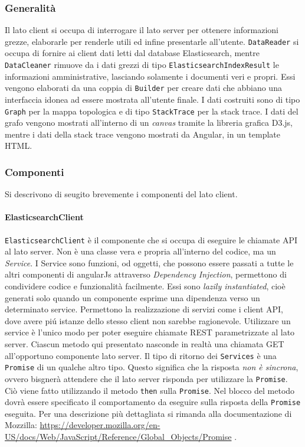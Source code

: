 \subsubsection{Generalità}
Il lato client si occupa di interrogare il lato server per ottenere informazioni grezze, elaborarle per renderle utili ed infine presentarle all'utente. \texttt{DataReader} si occupa di fornire ai client dati letti dal database Elasticsearch, mentre \texttt{DataCleaner} rimuove da i dati grezzi di tipo \texttt{ElasticsearchIndexResult} le informazioni amministrative, lasciando solamente i documenti veri e propri. Essi vengono elaborati da una coppia di \texttt{Builder} per creare dati che abbiano una interfaccia idonea ad essere mostrata all'utente finale. I dati costruiti sono di tipo \texttt{Graph} per la mappa topologica e di tipo \texttt{StackTrace} per la stack trace. I dati del grafo vengono mostrati all'interno di un \emph{canvas} tramite la libreria grafica D3.js, mentre i dati della stack trace vengono mostrati da Angular, in un template HTML. 

\subsubsection{Componenti} 
\label{sec:Componenti}
Si descrivono di seugito brevemente i componenti del lato client.

\paragraph{ElasticsearchClient} \Spazio
\label{sec:elasticsearchClient}
\texttt{ElasticsearchClient} è il componente che si occupa di eseguire le chiamate API al lato server. Non è una classe vera e propria all'interno del codice, ma un \emph{Service}. 
I Service sono funzioni, od oggetti, che possono essere passati a tutte le altri componenti di angularJs attraverso \emph{Dependency Injection}, permettono di condividere codice e funzionalità facilmente. Essi sono \emph{lazily instantiated}, cioè generati solo quando un componente esprime una dipendenza verso un determinato service. Permettono la realizzazione di servizi come i client API, dove avere piú istanze dello stesso client non sarebbe ragionevole. 
Utilizzare un service è l'unico modo per poter eseguire chiamate REST parametrizzate al lato server. Ciascun metodo qui presentato nasconde in realtà una chiamata GET all'opportuno componente lato server. 
Il tipo di ritorno dei \texttt{Services} è una \texttt{Promise} di un qualche altro tipo. Questo significa che la risposta \emph{non è sincrona}, ovvero bisgnerà attendere che il lato server risponda per utilizzare la \texttt{Promise}. Ciò viene fatto utilizzando il metodo \texttt{then} sulla \texttt{Promise}. Nel blocco del metodo dovrà essere specificato il comportamento da eseguire sulla risposta della \texttt{Promise} eseguita. Per una descrizione più dettagliata si rimanda alla documentazione di Mozzilla: \href{https://developer.mozilla.org/en-US/docs/Web/JavaScript/Reference/Global\_Objects/Promise}{https://developer.mozilla.org/en-US/docs/Web/JavaScript/Reference/Global\_Objects/Promise} .

